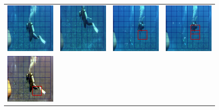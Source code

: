 \documentclass[letterpaper, 10pt, conference]{ieeeconf}
\begin{document}
\begin{figure}
\centering
\begin{tabular}{p{4.0cm} p{4.0cm} p{4.0cm} p{4.0cm}}
   \includegraphics[width=1.7in]{mdpm/real1} &
   \includegraphics[width=1.7in]{mdpm/real2} &
   \includegraphics[width=1.7in]{mdpm/real3} &
   \includegraphics[width=1.7in]{mdpm/real4} \\
   \includegraphics[width=1.7in]{mdpm/gen1} &

\end{tabular}
\end{figure}
\end{document}
